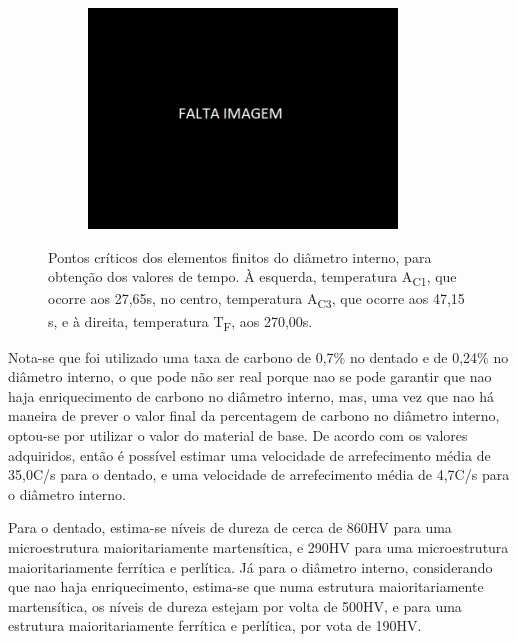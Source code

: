 \begin{figure}[htb]
\begin{subfigure}{.33\textwidth}
        \caption{}
        \label{fig:A1_Dint}
    \end{subfigure}
    \begin{subfigure}{.33\textwidth}
        \centering
        \includegraphics[width = 0.9\textwidth]{Figures/Cap4/Falta_Imagem.png}
        \caption{}
        \label{fig:Tf_Dint}
    \end{subfigure}
    \caption[Pontos críticos dos elementos finitos do diâmetro interno]%
    {Pontos críticos dos elementos finitos do diâmetro interno, para obtenção dos valores de tempo. À esquerda, temperatura A\textsubscript{C1}, que ocorre aos 27,65s, no centro, temperatura A\textsubscript{C3}, que ocorre aos 47,15 s, e à direita, temperatura T\textsubscript{F}, aos 270,00s.}
    \label{fig:Diametro}
\end{figure}
\par Nota-se que foi utilizado uma taxa de carbono de 0,7\% no dentado e de 0,24\% no diâmetro interno, o que pode não ser real porque nao se pode garantir que nao haja enriquecimento de carbono no diâmetro interno, mas, uma vez que nao há maneira de prever o valor final da percentagem de carbono no diâmetro interno, optou-se por utilizar o valor do material de base. De acordo com os valores adquiridos, então é possível estimar uma velocidade de arrefecimento média de 35,0\textdegree C/s para o dentado, e uma velocidade de arrefecimento média de 4,7\textdegree C/s para o diâmetro interno.
\par
Para o dentado, estima-se níveis de dureza de cerca de 860HV para uma microestrutura maioritariamente martensítica, e 290HV para uma microestrutura maioritariamente ferrítica e perlítica. Já para o diâmetro interno, considerando que nao haja enriquecimento, estima-se que numa estrutura maioritariamente martensítica, os níveis de dureza estejam por volta de 500HV, e para uma estrutura maioritariamente ferrítica e perlítica, por vota de 190HV.
